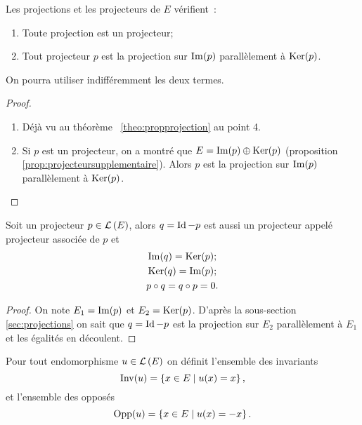 \begin{prop}
  Les projections et les projecteurs de \(E\) vérifient~:
  \begin{enumerate}
    \item Toute projection est un projecteur;
    \item Tout projecteur \(p\) est la projection sur \(\operatorname{Im}(p)\) 
      parallèlement à \(\operatorname{Ker}(p)\).
  \end{enumerate}
  On pourra utiliser indifféremment les deux termes.
\end{prop}
\begin{proof}
  \begin{enumerate}
    \item Déjà vu au théorème~
      \ref{theo:propprojection} au point 4.
    \item Si \(p\) est un projecteur, on a montré que \(E = \operatorname{Im}(p) \oplus 
      \operatorname{Ker}(p)\) (proposition~
      \ref{prop:projecteursupplementaire}). Alors \(p\) est la projection sur 
      \(\operatorname{Im}(p)\) parallèlement à \(\operatorname{Ker}(p)\).
  \end{enumerate}
\end{proof}

\begin{prop}
  Soit un projecteur \(p \in \mathcal{L}\left(E\right)\), alors \(q=\operatorname{Id}-p\) est aussi un 
  projecteur appelé projecteur associée de \(p\) et
  \begin{gather}
    \operatorname{Im}(q) = \operatorname{Ker}(p);\\
    \operatorname{Ker}(q)=\operatorname{Im}(p);\\
    p \circ q = q \circ p =0.
  \end{gather}
\end{prop}
\begin{proof}
  On note \(E_1 = \operatorname{Im}(p)\) et \(E_2 = \operatorname{Ker}(p)\). D'après la sous-section~
  \ref{sec:projections} on sait que \(q=\operatorname{Id}-p\) est la projection sur \(E_2\) 
  parallèlement à \(E_1\) et les égalités en découlent.
\end{proof}

\begin{defdef}
  Pour tout endomorphisme \(u \in \mathcal{L}\left(E\right)\) on définit l'ensemble des 
  invariants
  \begin{equation}
    \operatorname{Inv}(u)=\left\{x \in E\mathrel{}\middle|\mathrel{}u(x)=x\right\},
  \end{equation}
  et l'ensemble des opposés
  \begin{equation}
    \operatorname{Opp}(u)=\left\{x \in E\mathrel{}\middle|\mathrel{}u(x)=-x\right\}.
  \end{equation}
\end{defdef}

